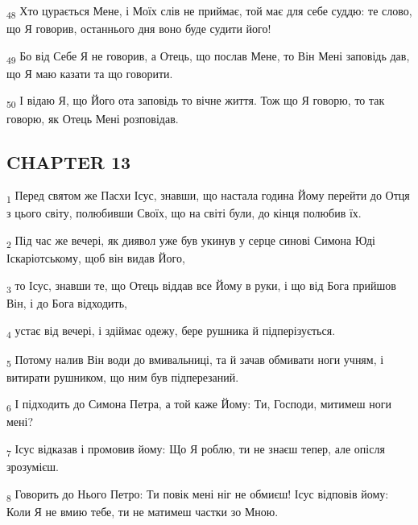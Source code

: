 \begin{tcolorbox}
\textsubscript{48} Хто цурається Мене, і Моїх слів не приймає, той має для себе суддю: те слово, що Я говорив, останнього дня воно буде судити його!
\end{tcolorbox}
\begin{tcolorbox}
\textsubscript{49} Бо від Себе Я не говорив, а Отець, що послав Мене, то Він Мені заповідь дав, що Я маю казати та що говорити.
\end{tcolorbox}
\begin{tcolorbox}
\textsubscript{50} І відаю Я, що Його ота заповідь то вічне життя. Тож що Я говорю, то так говорю, як Отець Мені розповідав.
\end{tcolorbox}
\subsection{CHAPTER 13}
\begin{tcolorbox}
\textsubscript{1} Перед святом же Пасхи Ісус, знавши, що настала година Йому перейти до Отця з цього світу, полюбивши Своїх, що на світі були, до кінця полюбив їх.
\end{tcolorbox}
\begin{tcolorbox}
\textsubscript{2} Під час же вечері, як диявол уже був укинув у серце синові Симона Юді Іскаріотському, щоб він видав Його,
\end{tcolorbox}
\begin{tcolorbox}
\textsubscript{3} то Ісус, знавши те, що Отець віддав все Йому в руки, і що від Бога прийшов Він, і до Бога відходить,
\end{tcolorbox}
\begin{tcolorbox}
\textsubscript{4} устає від вечері, і здіймає одежу, бере рушника й підперізується.
\end{tcolorbox}
\begin{tcolorbox}
\textsubscript{5} Потому налив Він води до вмивальниці, та й зачав обмивати ноги учням, і витирати рушником, що ним був підперезаний.
\end{tcolorbox}
\begin{tcolorbox}
\textsubscript{6} І підходить до Симона Петра, а той каже Йому: Ти, Господи, митимеш ноги мені?
\end{tcolorbox}
\begin{tcolorbox}
\textsubscript{7} Ісус відказав і промовив йому: Що Я роблю, ти не знаєш тепер, але опісля зрозумієш.
\end{tcolorbox}
\begin{tcolorbox}
\textsubscript{8} Говорить до Нього Петро: Ти повік мені ніг не обмиєш! Ісус відповів йому: Коли Я не вмию тебе, ти не матимеш частки зо Мною.
\end{tcolorbox}
